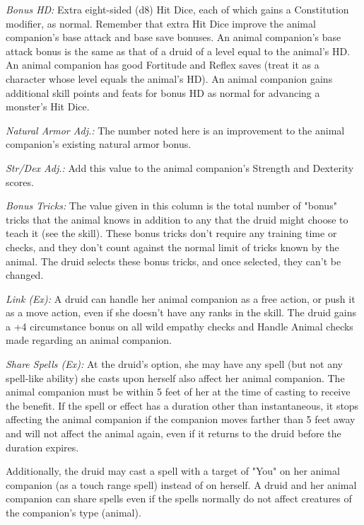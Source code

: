 \textit{Bonus HD:} Extra eight-sided (d8) Hit Dice, each of which gains a Constitution 
modifier, as normal. Remember that extra Hit Dice improve the animal companion's 
base attack and base save bonuses. An animal companion's base attack bonus is the 
same as that of a druid of a level equal to the animal's HD. An animal companion 
has good Fortitude and Reflex saves (treat it as a character whose level equals 
the animal's HD). An animal companion gains additional skill points and feats for 
bonus HD as normal for advancing a monster's Hit Dice.

\textit{Natural Armor Adj.:} The number noted here is an improvement to the animal 
companion's existing natural armor bonus.

\textit{Str/Dex Adj.:} Add this value to the animal companion's Strength and Dexterity 
scores.

\textit{Bonus Tricks:} The value given in this column is the total number of "bonus" 
tricks that the animal knows in addition to any that the druid might choose to 
teach it (see the  skill). These bonus tricks don't require any training 
time or  checks, and they don't count against the normal limit of 
tricks known by the animal. The druid selects these bonus tricks, and once selected, 
they can't be changed.

\textit{Link (Ex):} A druid can handle her animal companion as a free action, or 
push it as a move action, even if she doesn't have any ranks in the  
skill. The druid gains a +4 circumstance bonus on all wild empathy checks and Handle 
Animal checks made regarding an animal companion.

\textit{Share Spells (Ex):} At the druid's option, she may have any spell (but 
not any spell-like ability) she casts upon herself also affect her animal companion. 
The animal companion must be within 5 feet of her at the time of casting to receive 
the benefit. If the spell or effect has a duration other than instantaneous, it 
stops affecting the animal companion if the companion moves farther than 5 feet 
away and will not affect the animal again, even if it returns to the druid before 
the duration expires. 

Additionally, the druid may cast a spell with a target of "You" on her animal 
companion (as a touch range spell) instead of on herself. A druid and her animal 
companion can share spells even if the spells normally do not affect creatures 
of the companion's type (animal).

